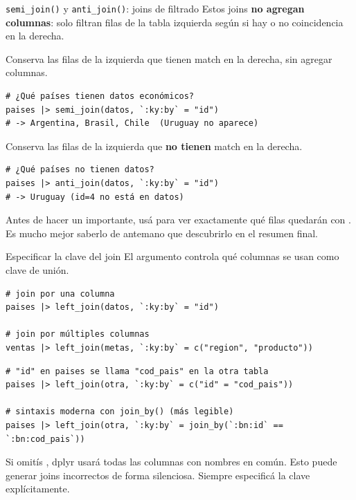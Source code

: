 \documentclass[8pt]{beamer}
\begin{document}
	\begin{frame}[fragile]{\texttt{semi\_join()} y \texttt{anti\_join()}: joins de filtrado}
		Estos joins \textbf{no agregan columnas}: solo filtran filas de la tabla izquierda según si hay o no coincidencia en la derecha.

		Conserva las filas de la izquierda que tienen match en la derecha, sin agregar columnas.
\begin{lstlisting}[style=RScript]
# ¿Qué países tienen datos económicos?
paises |> semi_join(datos, `:ky:by` = "id")
# -> Argentina, Brasil, Chile  (Uruguay no aparece)
\end{lstlisting}

		Conserva las filas de la izquierda que \textbf{no tienen} match en la derecha.
\begin{lstlisting}[style=RScript]
# ¿Qué países no tienen datos?
paises |> anti_join(datos, `:ky:by` = "id")
# -> Uruguay (id=4 no está en datos)
\end{lstlisting}

		\begin{exampleblock}{}
			Antes de hacer un  importante, usá  para ver exactamente qué filas quedarán con . Es mucho mejor saberlo de antemano que descubrirlo en el resumen final.
		\end{exampleblock}
	\end{frame}


	\begin{frame}[fragile]{Especificar la clave del join}
		El argumento  controla qué columnas se usan como clave de unión.

\begin{lstlisting}[style=RScript]
# join por una columna
paises |> left_join(datos, `:ky:by` = "id")

# join por múltiples columnas
ventas |> left_join(metas, `:ky:by` = c("region", "producto"))
\end{lstlisting}

\begin{lstlisting}[style=RScript]
# "id" en paises se llama "cod_pais" en la otra tabla
paises |> left_join(otra, `:ky:by` = c("id" = "cod_pais"))

# sintaxis moderna con join_by() (más legible)
paises |> left_join(otra, `:ky:by` = join_by(`:bn:id` == `:bn:cod_pais`))
\end{lstlisting}

		\begin{alertblock}{}
			Si omitís , dplyr usará todas las columnas con nombres en común. Esto puede generar joins incorrectos de forma silenciosa. Siempre especificá la clave explícitamente.
		\end{alertblock}
	\end{frame}
\end{document}
